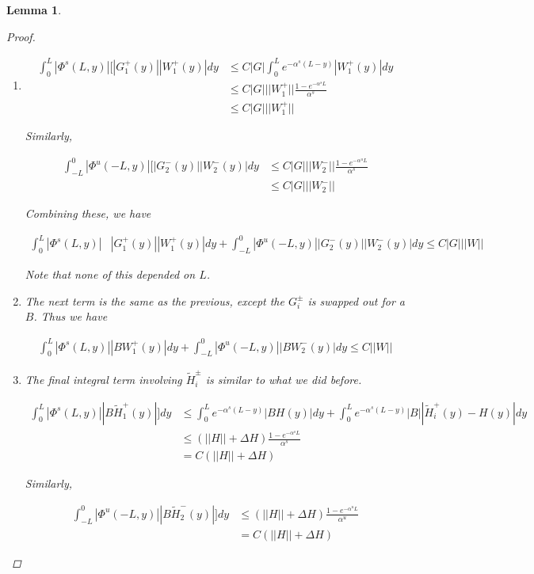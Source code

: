 \documentclass[12pt]{article}
\newtheorem{lemma}{Lemma}
\begin{document}
\begin{lemma}
\begin{proof}
\begin{enumerate}
\item
\begin{align*}
\int_0^L |\Phi^s(L, y)|[|G_1^+(y)||W_1^+(y)| dy &\leq C|G| \int_0^L e^{-\alpha^s(L-y)}|W_1^+(y)| dy \\
&\leq C|G|||W_1^+|| \frac{1 - e^{-\alpha^s L}}{\alpha^s} \\
&\leq C|G|||W_1^+||
\end{align*}

Similarly,

\begin{align*}
\int_{-L}^0 |\Phi^u(-L, y)|[|G_2^-(y)||W_2^-(y)| dy &\leq C|G|||W_2^-|| \frac{1 - e^{-\alpha^u L}}{\alpha^s} \\
&\leq C|G|||W_2^-||
\end{align*}

Combining these, we have

\begin{align*}
\int_0^L |\Phi^s(L, y)|&|G_1^+(y)||W_1^+(y)| dy + \int_{-L}^0 |\Phi^u(-L, y)||G_2^-(y)||W_2^-(y)| dy \leq C|G| ||W||
\end{align*}

Note that none of this depended on $L$.

\item The next term is the same as the previous, except the $G_i^\pm$ is swapped out for a $B$. Thus we have

\begin{align*}
\int_0^L |\Phi^s(L, y)||BW_1^+(y)| dy + \int_{-L}^0 |\Phi^u(-L, y)||BW_2^-(y)| dy \leq C ||W||
\end{align*}

\item The final integral term involving $\tilde{H}_i^\pm$ is similar to what we did before.

\begin{align*}
\int_0^L |\Phi^s(L, y)|| B \tilde{H}_1^+(y)| ] dy &\leq \int_0^L e^{-\alpha^s (L - y)}|BH(y)| dy + \int_0^L e^{-\alpha^s (L - y)}|B||\tilde{H}_i^+(y) - H(y)| dy \\
&\leq (||H|| + \Delta H)\frac{1 - e^{-\alpha^s L}}{\alpha^s} \\
&= C( ||H|| + \Delta H )
\end{align*}

Similarly,

\begin{align*}
\int_{-L}^0 |\Phi^u(-L, y)||B \tilde{H}_2^-(y)| ] dy &\leq (||H|| + \Delta H)\frac{1 - e^{-\alpha^u L}}{\alpha^u} \\
&= C( ||H|| + \Delta H )
\end{align*}


\end{enumerate}
\end{proof}
\end{lemma}
\end{document}
